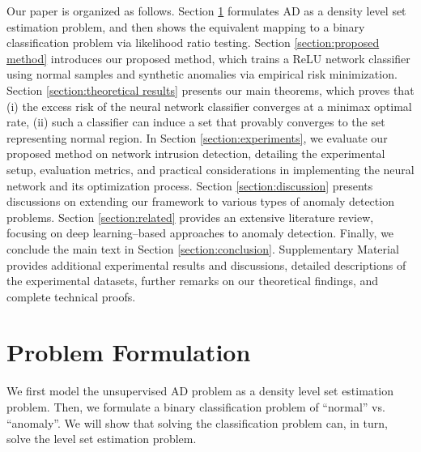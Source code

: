 \documentclass{article}
\begin{document}
Our paper is organized as follows.
Section \ref{section:problem formulation} formulates AD as a density level set estimation problem, and then shows the equivalent mapping to a binary classification problem via likelihood ratio testing.
Section \ref{section:proposed method}  introduces our proposed method, which trains a ReLU network classifier using normal samples and synthetic anomalies via empirical risk minimization.
Section \ref{section:theoretical results} presents our main theorems, which proves that (i) the excess risk of the neural network classifier converges at a minimax optimal rate, (ii) such a classifier can induce a set that provably converges to the set representing normal region. 
In Section \ref{section:experiments}, we evaluate our proposed method on network intrusion detection, detailing the experimental setup, evaluation metrics, and practical considerations in implementing the neural network and its optimization process.
Section \ref{section:discussion} presents discussions on extending our framework to various types of anomaly detection problems. Section \ref{section:related} provides an extensive literature review, focusing on deep learning–based approaches to anomaly detection. Finally, we conclude the main text in Section \ref{section:conclusion}.
 Supplementary Material provides additional experimental results and discussions, detailed descriptions of the experimental datasets, further remarks on our theoretical findings, and complete technical proofs.


%
\section{Problem Formulation}
\label{section:problem formulation}
We first model the unsupervised AD problem as a density level set estimation problem. 
Then, we formulate a binary classification problem of ``normal'' vs. ``anomaly''.
We will show that solving the classification problem can, in turn, solve the level set estimation problem.
\end{document}
